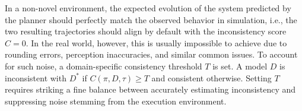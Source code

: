 \documentclass[letterpaper]{article} %
\begin{document}





In a non-novel environment, the expected evolution of the system predicted by the planner should perfectly match the observed behavior in simulation, i.e., the two resulting trajectories should align by default with the inconsistency score $C=0$. In the real world, however, this is usually impossible to achieve due to rounding errors, perception inaccuracies, and similar common issues. To account for such noise, a domain-specific consistency threshold $T$ is set. A model $D$ is inconsistent with $D^*$ if $C(\pi, D, \tau) \ge T$ and consistent otherwise. Setting $T$ requires striking a fine balance between accurately estimating inconsistency and suppressing noise stemming from the execution environment.
\end{document}
